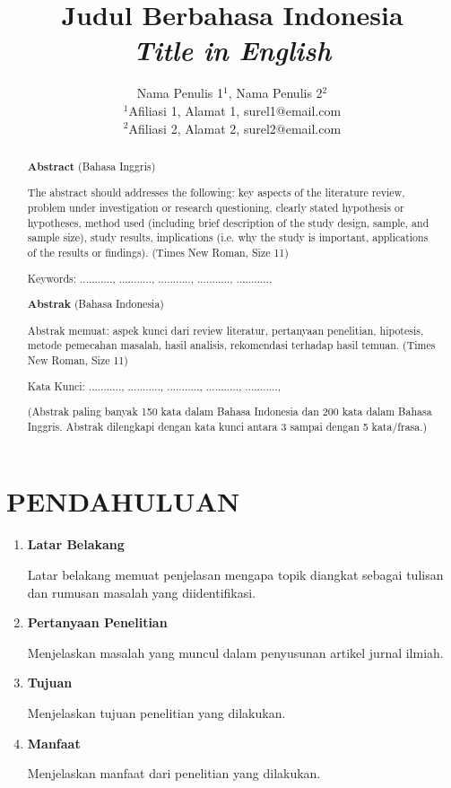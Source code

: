 \documentclass[12pt,a4paper]{article}
\title{\textbf{Judul Berbahasa Indonesia} \\ \emph{Title in English}}
\author{Nama Penulis 1$^{1}$, Nama Penulis 2$^{2}$ \\ $^{1}$Afiliasi 1, Alamat 1, surel1@email.com \\ $^{2}$Afiliasi 2, Alamat 2, surel2@email.com}
\date{}
\begin{document}
\maketitle

\begin{abstract}
\textbf{Abstract} (Bahasa Inggris)

The abstract should addresses the following: key aspects of the literature review, problem under investigation or research questioning, clearly stated hypothesis or hypotheses, method used (including brief description of the study design, sample, and sample size), study results, implications (i.e. why the study is important, applications of the results or findings). (Times New Roman, Size 11)

Keywords: ..........., ..........., ..........., ..........., ...........,

\textbf{Abstrak} (Bahasa Indonesia)

Abstrak memuat: aspek kunci dari review literatur, pertanyaan penelitian, hipotesis, metode pemecahan masalah, hasil analisis, rekomendasi terhadap hasil temuan. (Times New Roman, Size 11)

Kata Kunci: ..........., ..........., ..........., ..........., ...........,

(Abstrak paling banyak 150 kata dalam Bahasa Indonesia dan 200 kata dalam Bahasa Inggris. Abstrak dilengkapi dengan kata kunci antara 3 sampai dengan 5 kata/frasa.)
\end{abstract}

\section{\textbf{PENDAHULUAN}}

\begin{enumerate}
\def\labelenumi{\Alph{enumi}.}
\item \textbf{Latar Belakang}

Latar belakang memuat penjelasan mengapa topik diangkat sebagai tulisan dan rumusan masalah yang diidentifikasi.

\item \textbf{Pertanyaan Penelitian}

Menjelaskan masalah yang muncul dalam penyusunan artikel jurnal ilmiah.

\item \textbf{Tujuan}

Menjelaskan tujuan penelitian yang dilakukan.

\item \textbf{Manfaat}

Menjelaskan manfaat dari penelitian yang dilakukan.
\end{enumerate}
\end{document}
